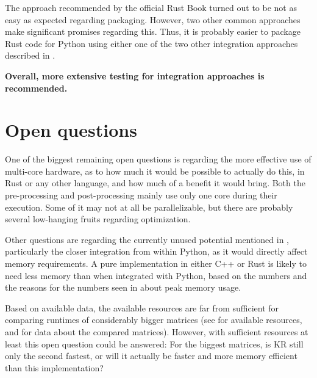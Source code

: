 The approach recommended by the official Rust Book turned out to be not as easy
as expected regarding packaging. However, two other common approaches make
significant promises regarding this. Thus, it is probably easier to package
Rust code for Python using either one of the two other integration approaches
described in .

\textbf{Overall, more extensive testing for integration approaches is recommended.}


\section{Open questions}

One of the biggest remaining open questions is regarding the more effective use
of multi-core hardware, as to how much it would be possible to actually do
this, in Rust or any other language, and how much of a benefit it would bring.
Both the pre-processing and post-processing mainly use only one core during
their execution. Some of it may not at all be parallelizable, but there are
probably several low-hanging fruits regarding optimization.

Other questions are regarding the currently unused potential mentioned in
, particularly the closer integration from within Python,
as it would directly affect memory requirements. A pure implementation in
either C++ or Rust is likely to need less memory than when integrated with
Python, based on the numbers and the reasons for the numbers seen in
 about peak memory usage.

Based on available data, the available resources are far from sufficient for
comparing runtimes of considerably bigger matrices (see  for
available resources, and  for data about the compared
matrices).
However, with sufficient resources at least this open question could be
answered: For the biggest matrices, is KR still only the second fastest, or
will it actually be faster and more memory efficient than this implementation?









\newpage














